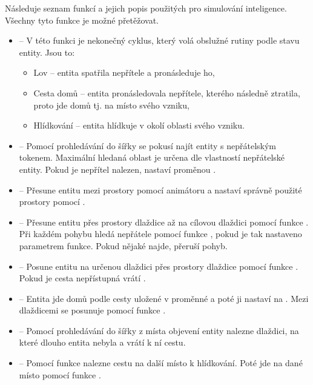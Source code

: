 Následuje seznam funkcí a jejich popis použitých pro simulování inteligence. Všechny tyto funkce je možné přetěžovat.
\begin{itemize}

\item {} -- V této funkci je nekonečný cyklus, který volá obslužné rutiny podle stavu entity. Jsou to:
	\begin{itemize}
    \item Lov -- entita spatřila nepřítele a pronásleduje ho, 
    \item Cesta domů -- entita pronásledovala nepřítele, kterého následně ztratila, proto jde domů tj. na místo svého vzniku,
    \item Hlídkování -- entita hlídkuje v okolí oblasti svého vzniku.
	\end{itemize}

\item {} -- Pomocí prohledávání do šířky se pokusí najít entity s nepřátelským tokenem. Maximální hledaná oblast
je určena dle vlastností nepřátelské entity. Pokud je nepřítel nalezen, nastaví proměnou .

\item {} -- Přesune entitu mezi prostory pomocí animátoru a nastaví správně použité prostory pomocí .

\item {} -- Přesune entitu přes prostory dlaždice až na cílovou dlaždici pomocí funkce . Při každém pohybu hledá nepřátele
pomocí funkce , pokud je tak nastaveno parametrem funkce. Pokud nějaké najde, přeruší pohyb.

\item {} -- Posune entitu na určenou dlaždici přes prostory dlaždice pomocí funkce .
 Pokud je cesta nepřístupná vrátí .

\item {} -- Entita jde domů podle cesty uložené v proměnné  a poté ji nastaví na . 
         Mezi dlaždicemi se posunuje pomocí funkce .

\item {} -- Pomocí prohledávání do šířky z místa objevení entity nalezne dlaždici, na které dlouho
entita nebyla a vrátí k ní cestu.

\item {} -- Pomocí funkce  nalezne cestu na další místo k hlídkování. Poté jde na dané místo
 pomocí funkce .


\end{itemize}
